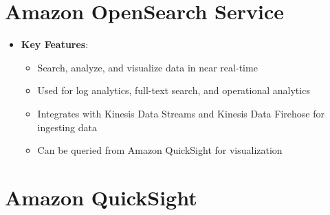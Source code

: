 \documentclass[11pt,a4paper]{report}
\begin{document}
\section{Amazon OpenSearch Service}

\begin{itemize}
  \item \textbf{Key Features}:
\begin{itemize}
  \item Search, analyze, and visualize data in near real-time
  \item Used for log analytics, full-text search, and operational analytics
  \item Integrates with Kinesis Data Streams and Kinesis Data Firehose for ingesting data
  \item Can be queried from Amazon QuickSight for visualization
\end{itemize}
\end{itemize}


\section{Amazon QuickSight}
\end{document}
